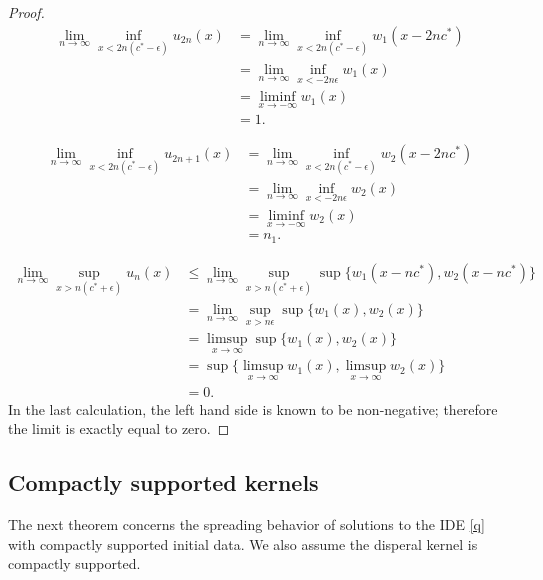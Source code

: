 \documentclass[11pt]{article}
\theoremstyle{definition}
\numberwithin{equation}{section}
\numberwithin{thm}{section}
\newcommand{\m}{n_1}
\begin{document}
\begin{proof}
\begin{equation} \begin{aligned}
\lim_{n\to\infty}\inf_{x<2n(c^*-\epsilon)}u_{2n}(x)
&= \lim_{n\to\infty}\inf_{x<2n(c^*-\epsilon)}w_1(x-2nc^*) \\
&= \lim_{n\to\infty}\inf_{x<-2n\epsilon}w_1(x) \\
&= \liminf_{x\to-\infty}w_1(x) \\ &= 1.
\end{aligned} \end{equation}

\begin{equation} \begin{aligned}
\lim_{n\to\infty}\inf_{x<2n(c^*-\epsilon)}u_{2n+1}(x)
&= \lim_{n\to\infty}\inf_{x<2n(c^*-\epsilon)}w_2(x-2nc^*) \\
&= \lim_{n\to\infty}\inf_{x<-2n\epsilon}w_2(x) \\
&= \liminf_{x\to-\infty}w_2(x) \\ &= \m.
\end{aligned} \end{equation}

\begin{equation} \begin{aligned}
\lim_{n\to\infty} \sup_{x>n(c^*+\epsilon)} u_n(x) 
&\leq \lim_{n\to\infty} \sup_{x>n(c^*+\epsilon)} \sup\{w_1(x-nc^*),w_2(x-nc^*)\} \\
&= \lim_{n\to\infty} \sup_{x>n\epsilon} \sup\{w_1(x),w_2(x)\} \\
&= \limsup_{x\to\infty} \sup\{w_1(x),w_2(x)\} \\ 
&= \sup\{\limsup_{x\to\infty} w_1(x),\limsup_{x\to\infty} w_2(x)\} \\
&= 0.
\end{aligned} \end{equation}
In the last calculation, the left hand side is known to be non-negative; therefore the limit is exactly equal to zero.
\end{proof}

\subsection{Compactly supported kernels}

The next theorem concerns the spreading behavior of solutions to the IDE \eqref{q} with compactly supported initial data. We also assume the disperal kernel is compactly supported.%
\end{document}
